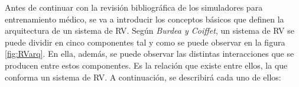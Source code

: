 Antes de continuar con la revisión bibliográfica de los simuladores para entrenamiento médico, se va a introducir los conceptos básicos que definen la arquitectura de un sistema de \ac{RV}. %
Según \emph{Burdea y Coiffet}\cite{burdea2003virtual}, un sistema de \ac{RV} se puede dividir en cinco componentes tal y como se puede observar en la figura \ref{fig:RVarq}. En ella, además, se puede observar las distintas interacciones que se producen entre estos componentes. Es la relación que existe entre ellos, la que conforma un sistema de \ac{RV}. A continuación, se describirá cada uno de ellos:
